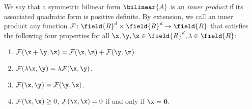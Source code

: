 

\begin{example}\label{example:innerprod}
We say that a symmetric bilinear form $\bilinear{A}$ is an \emph{inner product} if its associated quadratic form is positive definite.  By extension, we call an inner product any function $\mathcal{F} \colon \field{R}^d \times \field{R}^d \to \field{R}$ that satisfies the following four properties for all $\x, \y, \z \in \field{R}^d, \lambda \in \field{R}$:
\begin{enumerate}
\item $\mathcal{F}(\x+\y, \z) = \mathcal{F}(\x, \z) + \mathcal{F}(\y, \z)$.
\item $\mathcal{F}(\lambda \x, \y) = \lambda \mathcal{F}(\x, \y)$.
\item $\mathcal{F}(\x, \y) = \mathcal{F}(\y, \x)$.
\item $\mathcal{F}(\x, \x) \geq 0$, $\mathcal{F}(\x, \x) = 0$ if and only if $\x = \boldsymbol{0}$.
\end{enumerate}
\end{example}

